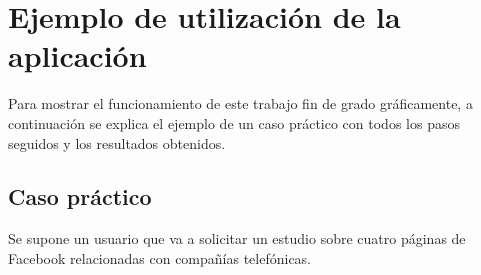 \chapter{Ejemplo de utilización de la aplicación}

Para mostrar el funcionamiento de este trabajo fin de grado gráficamente, a continuación se explica el ejemplo de un caso práctico con todos los pasos seguidos y los resultados obtenidos. 

\section{Caso práctico}

Se supone un usuario que va a solicitar un estudio sobre cuatro páginas de Facebook relacionadas con compañías telefónicas.

